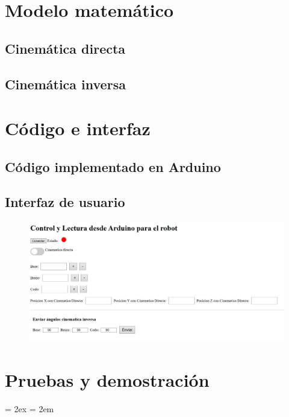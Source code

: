 \documentclass[11pt]{article}
\begin{document}

\section{Modelo matemático}
\label{sec:modelo}


\subsection{Cinemática directa}

\subsection{Cinemática inversa}



\section{Código e interfaz}
\label{sec:código}



\subsection{Código implementado en Arduino}


\subsection{Interfaz de usuario}
\begin{figure}[H]
    \centering
    \includegraphics[width=0.65\linewidth]{figuras/interfaz.jpeg}
    \caption{}
\end{figure}

\section{Pruebas y demostración}
\label{sec:pruebas}

\bibitemsep = 2ex
\bibhang = 2em


\end{document}
